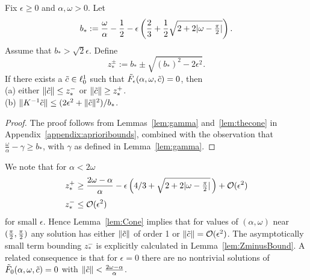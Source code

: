 \begin{lemma}\label{lem:Cone}
	Fix $ \epsilon \geq 0$ and $\alpha,\omega >0$. 
	Let
	\[
	b_* :=  \frac{\omega}{\alpha} - \frac{1}{2} - \epsilon  \left(\frac{2}{3}+ \frac{1}{2}\sqrt{2 + 2 |\omega-\tfrac{\pi}{2}| } \right).
	\]
Assume that $b_*> \sqrt{2} \epsilon$. 
Define
\begin{equation}\label{e:zstar}
z^{\pm}_* :=b_* \pm \sqrt{(b_*)^2- 2 \epsilon^2 } .
\end{equation}
If there exists a $\tilde{c} \in \ell^1_0$ such that $\tilde{F}_\epsilon(\alpha, \omega,\tilde{c}) = 0$, then \\
\mbox{}\quad\textup{(a)} either $ \|\tilde{c}\| \leq  z_*^-$ or $ \|\tilde{c}\| \geq z_*^+  $.\\
\mbox{}\quad\textup{(b)} 
$ \| K^{-1} \tilde{c} \| \leq (2\epsilon^2+ \|\tilde{c}\|^2) / b_*$. 
\end{lemma}
\begin{proof}
	The proof follows from Lemmas~\ref{lem:gamma} and~\ref{lem:thecone} in Appendix~\ref{appendix:aprioribounds}, combined with the observation that
$\frac{\omega}{\alpha} - \gamma \geq b_*$,
with $\gamma$ as defined in Lemma~\ref{lem:gamma}.
\end{proof}

\begin{remark}\label{r:smalleps}
We note that for $\alpha < 2\omega$
\begin{alignat*}{1}
z^+_* &\geq   \frac{2 \omega - \alpha}{\alpha} 
- \epsilon \left(4/3+\sqrt{2 + 2 |\omega-\tfrac{\pi}{2}| } \, \right) + \mathcal{O}(\epsilon^2)
\\[1mm]
z^-_* & \leq   \mathcal{O}(\epsilon^2)
\end{alignat*}
for small $\epsilon$. 
Hence Lemma~\ref{lem:Cone} implies that for values of $(\alpha,\omega)$ near $(\tfrac{\pi}{2},\tfrac{\pi}{2})$ any solution has either $\|\tilde{c}\|$ of order 1 or $\|\tilde{c}\| =  \mathcal{O}(\epsilon^2)$. 
The asymptotically small term bounding $z_*^-$ is explicitly calculated in Lemma~\ref{lem:ZminusBound}. 
A related consequence is that for $\epsilon=0$ there are no nontrivial solutions 
of $\tilde{F}_0(\alpha,\omega,\tilde{c})=0$ with 
$\| \tilde{c} \| < \frac{2 \omega - \alpha}{\alpha} $. 
\end{remark}

